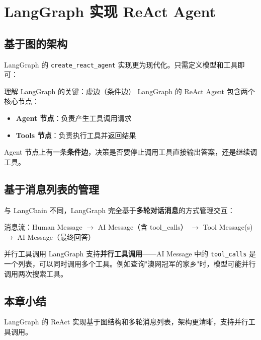 \section{LangGraph 实现 ReAct Agent}

\subsection{基于图的架构}

LangGraph 的 \texttt{create\_react\_agent} 实现更为现代化。只需定义模型和工具即可：

\begin{importantbox}{理解 LangGraph 的关键：虚边（条件边）}
LangGraph 的 ReAct Agent 包含两个核心节点：
\begin{itemize}
    \item \textbf{Agent 节点}：负责产生工具调用请求
    \item \textbf{Tools 节点}：负责执行工具并返回结果
\end{itemize}
Agent 节点上有一条\textbf{条件边}，决策是否要停止调用工具直接输出答案，还是继续调工具。
\end{importantbox}

\subsection{基于消息列表的管理}

与 LangChain 不同，LangGraph 完全基于\textbf{多轮对话消息}的方式管理交互：

消息流：Human Message $\rightarrow$ AI Message（含 tool\_calls） $\rightarrow$ Tool Message(s) $\rightarrow$ AI Message（最终回答）

\begin{knowledgebox}{并行工具调用}
LangGraph 支持\textbf{并行工具调用}——AI Message 中的 \texttt{tool\_calls} 是一个列表，可以同时调用多个工具。例如查询"澳网冠军的家乡"时，模型可能并行调用两次搜索工具。
\end{knowledgebox}

\subsection{本章小结}
LangGraph 的 ReAct 实现基于图结构和多轮消息列表，架构更清晰，支持并行工具调用。

